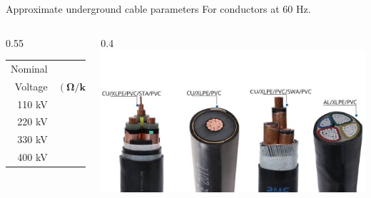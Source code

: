 \begin{frame}{Approximate underground cable parameters}
For conductors at 60 Hz.
\begin{columns}
    \begin{column}{0.55\textwidth}
\begin{table}
\begin{tabular}{rrrr}
\hline Nominal  & $\boldsymbol{R}$ & $\omega L$& $\omega \boldsymbol{C}$ \\
Voltage & $(\boldsymbol{\Omega} / \mathbf{k m})$ & $(\boldsymbol{\Omega} / \mathbf{k m})$ & $ (\boldsymbol{\mu} \boldsymbol{\mho} / \mathbf{k m})$ \\
\hline 
110 kV	& 0.05	& 0.030	&  95 \\
220 kV	& 0.04	& 0.025	& 115\\
330 kV	& 0.03	& 0.020	& 130\\
400 kV	& 0.02	& 0.018	& 150\\
\hline
\end{tabular}
\end{table}
    \end{column}
    \begin{column}{0.4\textwidth}
    \includegraphics[width=\textwidth]{images/Cable-Electrico-Subterraneo.jpeg}
    \end{column}
\end{columns}
\end{frame}

